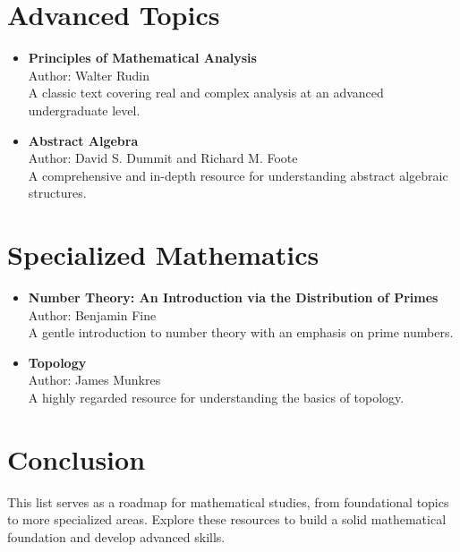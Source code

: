\documentclass[a4paper,11pt]{article}
\begin{document}
\section{Advanced Topics}
\begin{itemize}[left=0pt]
    \item \textbf{Principles of Mathematical Analysis}\\
    Author: Walter Rudin\\
    A classic text covering real and complex analysis at an advanced undergraduate level.

    \item \textbf{Abstract Algebra}\\
    Author: David S. Dummit and Richard M. Foote\\
    A comprehensive and in-depth resource for understanding abstract algebraic structures.
\end{itemize}

\section{Specialized Mathematics}
\begin{itemize}[left=0pt]
    \item \textbf{Number Theory: An Introduction via the Distribution of Primes}\\
    Author: Benjamin Fine\\
    A gentle introduction to number theory with an emphasis on prime numbers.
    
    \item \textbf{Topology}\\
    Author: James Munkres\\
    A highly regarded resource for understanding the basics of topology.
\end{itemize}

\section*{Conclusion}
This list serves as a roadmap for mathematical studies, from foundational topics to more specialized areas. Explore these resources to build a solid mathematical foundation and develop advanced skills.
\end{document}
